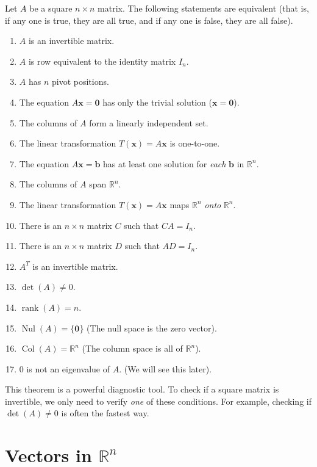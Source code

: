 \begin{theorem}
Let $A$ be a square $n \times n$ matrix. The following statements are equivalent (that is, if any one is true, they are all true, and if any one is false, they are all false).
\begin{enumerate}
    \item $A$ is an invertible matrix.
    \item $A$ is row equivalent to the identity matrix $I_n$.
    \item $A$ has $n$ pivot positions.
    \item The equation $A\mathbf{x} = \mathbf{0}$ has only the trivial solution ($\mathbf{x} = \mathbf{0}$).
    \item The columns of $A$ form a linearly independent set.
    \item The linear transformation $T(\mathbf{x}) = A\mathbf{x}$ is one-to-one.
    \item The equation $A\mathbf{x} = \mathbf{b}$ has at least one solution for \emph{each} $\mathbf{b}$ in $\mathbb{R}^n$.
    \item The columns of $A$ span $\mathbb{R}^n$.
    \item The linear transformation $T(\mathbf{x}) = A\mathbf{x}$ maps $\mathbb{R}^n$ \emph{onto} $\mathbb{R}^n$.
    \item There is an $n \times n$ matrix $C$ such that $CA = I_n$.
    \item There is an $n \times n$ matrix $D$ such that $AD = I_n$.
    \item $A^T$ is an invertible matrix.
    \item $\det(A) \neq 0$.
    \item $\operatorname{rank}(A) = n$.
    \item $\operatorname{Nul}(A) = \{\mathbf{0}\}$ (The null space is the zero vector).
    \item $\operatorname{Col}(A) = \mathbb{R}^n$ (The column space is all of $\mathbb{R}^n$).
    \item 0 is not an eigenvalue of $A$. (We will see this later).
\end{enumerate}
\end{theorem}

This theorem is a powerful diagnostic tool. To check if a square matrix is invertible, we only need to verify \emph{one} of these conditions. For example, checking if $\det(A) \neq 0$ is often the fastest way.

\section{Vectors in $\mathbb{R}^n$}

